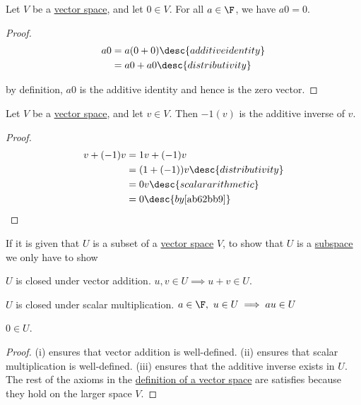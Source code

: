 \label{e658c50}

Let $V$ be a \href{fc83050}{vector space}, and let $0\in V$. For all $a\in\F$,
we have $a0=0$.

\begin{proof}
  \begin{align*}
    a0 &=a(0+0)\desc{additive identity} \\
       &=a0+a0\desc{distributivity}
  \end{align*}

  by definition, $a0$ is the additive identity and hence is the zero vector.
\end{proof}

\label{f8e46a2}

Let $V$ be a \href{fc83050}{vector space}, and let $v\in V$. Then $-1(v)$ is
the additive inverse of $v$.

\begin{proof}
  \begin{align*}
    v+(-1)v &=1v+(-1)v                       \\
            &=(1+(-1))v\desc{distributivity} \\
            &=0v\desc{scalar arithmetic}     \\
            &=0\desc{by \autoref{ab62bb9}}
  \end{align*}
\end{proof}

\label{dea139b}

If it is given that $U$ is a subset of a \href{fc83050}{vector space} $V$, to
show that $U$ is a \href{a0f0f06}{subspace} we only have to show
\begin{enumerati}
  \item $U$ is closed under vector addition. $u,v\in U\implies u+v\in U$.
  \item $U$ is closed under scalar multiplication. $a\in\F,\ u\in
  U\implies au\in U$
  \item $0\in U$.
\end{enumerati}

\begin{proof}
  (i) ensures that vector addition is well-defined. (ii) ensures that scalar
  multiplication is well-defined. (iii) ensures that the additive inverse exists
  in $U$. The rest of the axioms in the \href{fc83050}{definition of a vector
  space} are satisfies because they hold on the larger space $V$.
\end{proof}

